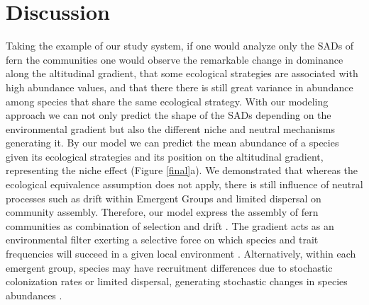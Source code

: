 \documentclass[12pt]{article}
\begin{document}

\section*{Discussion}

Taking the example of our study system, if one would analyze only the SADs of fern the communities one would observe the remarkable change in dominance along the altitudinal gradient, that some ecological strategies are associated with high abundance values, and that there there is still great variance in abundance among species that
share the same ecological strategy.  
With our modeling approach we can not only predict the shape of the SADs depending on the environmental gradient but also the different niche and neutral mechanisms generating it. By our model we can predict the mean abundance of a species given its ecological strategies and its position on the altitudinal gradient, representing the niche effect (Figure \ref{final}a).%
We demonstrated that whereas the
ecological equivalence assumption does not apply, there is still
influence of neutral processes such as drift within Emergent Groups
and limited dispersal on community assembly.
Therefore, our model express the assembly of fern communities as combination of 
selection and drift \citep{Vellend2010}. The gradient acts as an environmental
filter exerting a selective force on which species and trait frequencies will succeed
in a given local environment \citep{Webb2010}. 
Alternatively, within each emergent group,
species may have recruitment differences due to stochastic colonization
rates or limited dispersal, generating stochastic changes in species
abundances \citep{Gravel2006, Weiher2011}.
\end{document}
